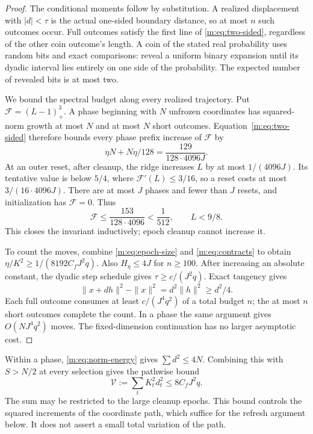 \documentclass[11pt]{amsart}
\theoremstyle{definition}\newtheorem{definition}[theorem]{Definition}
\theoremstyle{remark}\newtheorem{remark}[theorem]{Remark}
\numberwithin{equation}{section}
\begin{document}
\begin{proof}
The conditional moments follow by substitution. A realized displacement
with $|d|<\tau$ is the actual one-sided boundary distance, so at most $n$
such outcomes occur. Full outcomes satisfy the first line of
\eqref{m:eq:two-sided}, regardless of the other coin outcome's length.
A coin of the stated real probability uses random bits and exact
comparisons: reveal a uniform binary expansion until its dyadic interval
lies entirely on one side of the probability. The expected number of
revealed bits is at most two.

We bound the spectral budget along every realized trajectory. Put $\mathcal F=(L-1)_+^3$.
A phase beginning with $N$ unfrozen coordinates has squared-norm growth
at most $N$ and at most $N$ short outcomes. Equation~\eqref{m:eq:two-sided}
therefore bounds every phase prefix increase of $\mathcal F$ by
\[
 \eta N+N\eta/128=\frac{129}{128\cdot4096J}.
\]
At an outer reset, after cleanup, the ridge increases $L$ by at most
$1/(4096J)$. Its tentative value is below $5/4$, where
$\mathcal F'(L)\le3/16$, so a reset costs at most $3/(16\cdot4096J)$.
There are at most $J$ phases and fewer than $J$ resets, and initialization
has $\mathcal F=0$. Thus
\begin{equation}
 \mathcal F\le\frac{153}{128\cdot4096}<\frac1{512},
 \qquad L<9/8.                                             \label{m:eq:spectral-budget}
\end{equation}
This closes the invariant inductively; epoch cleanup cannot increase it.

To count the moves, combine \eqref{m:eq:epoch-size} and
\eqref{m:eq:contracts} to obtain
$\eta/K^2\ge1/(8192C_fJ^2q)$. Also $H_\eta\le4J$ for $n\ge100$.
After increasing an absolute constant, the dyadic step schedule gives
$\tau\ge c/(J^2q)$. Exact tangency gives
\begin{equation}
 \|x+dh\|^2-\|x\|^2=d^2\|h\|^2\ge d^2/4.               \label{m:eq:norm-energy}
\end{equation}
Each full outcome consumes at least $c/(J^4q^2)$ of a total budget $n$;
the at most $n$ short outcomes complete the count. In a phase the same
argument gives $O(NJ^4q^2)$ moves. The fixed-dimension continuation has
no larger asymptotic cost.
\end{proof}

Within a phase, \eqref{m:eq:norm-energy} gives $\sum d^2\le4N$.
Combining this with $S>N/2$ at every selection gives the pathwise bound
\begin{equation}
 \mathcal V:=\sum_tK_t^2d_t^2\le8C_fJ^2q.                 \label{m:eq:variation}
\end{equation}
The sum may be restricted to the large cleanup epochs. This bound controls the squared increments of the coordinate path,
which suffice for the refresh argument below. It does not assert a small
total variation of the path.
\end{document}
